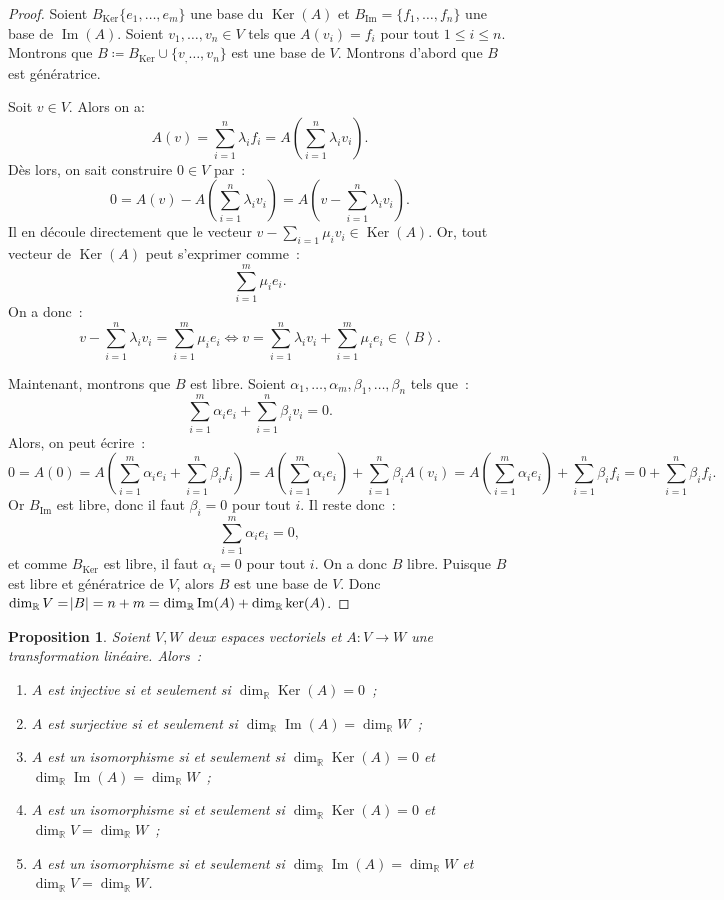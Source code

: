 \documentclass{article}
\DeclareMathOperator{\Ker}{Ker}
\DeclareMathOperator{\Imf}{Im}
\newcommand{\R}{\mathbb R}
\newcommand{\eng}[1]{\left\langle#1\right\rangle}
\newtheorem{prp}[thm]{Proposition}
\theoremstyle{definition}
\theoremstyle{remark}
\begin{document}
		\begin{proof} Soient $B_{\Ker}\{e_1, \dotsc, e_m\}$ une base du $\Ker(A)$ et $B_{\Imf} = \{f_1, \dotsc, f_n\}$ une base de $\Imf(A)$. Soient
		$v_1, \dotsc, v_n \in V$ tels que $A(v_i) = f_i$ pour tout $1 \leq i \leq n$. Montrons que $B \coloneqq B_{\Ker} \cup \{v_, \dotsc, v_n\}$ est une base de $V$.
		Montrons d'abord que $B$ est génératrice.

		Soit $v \in V$. Alors on a: \[A(v) = \sum_{i=1}^n\lambda_if_i = A\left(\sum_{i=1}^n\lambda_iv_i\right).\] Dès lors, on sait construire $0 \in V$ par~:
		\[0 = A(v) - A\left(\sum_{i=1}^n\lambda_iv_i\right) = A\left(v-\sum_{i=1}^n\lambda_iv_i\right).\] Il en découle directement que le vecteur
		$v - \sum_{i=1}\mu_iv_i \in \Ker(A)$. Or, tout vecteur de $\Ker(A)$ peut s'exprimer comme~: \[\sum_{i=1}^m\mu_ie_i.\] On a donc~:
		\[v-\sum_{i=1}^n\lambda_iv_i = \sum_{i=1}^m\mu_ie_i \iff v = \sum_{i=1}^n\lambda_iv_i + \sum_{i=1}^m\mu_ie_i \in \eng B.\]

		Maintenant, montrons que $B$ est libre. Soient $\alpha_1, \dotsc, \alpha_m, \beta_1, \dotsc, \beta_n$ tels que~:
		\[\sum_{i=1}^m\alpha_ie_i + \sum_{i=1}^n\beta_iv_i = 0.\] Alors, on peut écrire~:
		\[0 = A(0) = A\left(\sum_{i=1}^m\alpha_ie_i + \sum_{i=1}^n\beta_if_i\right) = A\left(\sum_{i=1}^m\alpha_ie_i\right) + \sum_{i=1}^n\beta_iA(v_i)
		= A\left(\sum_{i=1}^m\alpha_ie_i\right) + \sum_{i=1}^n\beta_if_i = 0 + \sum_{i=1}^n\beta_if_i.\] Or $B_{\Imf}$ est libre, donc il faut $\beta_i = 0$ pour tout
		$i$. Il reste donc~: \[\sum_{i=1}^m\alpha_ie_i = 0,\] et comme $B_{\Ker}$ est libre, il faut $\alpha_i = 0$ pour tout $i$. On a donc $B$ libre. Puisque $B$ est
		libre et génératrice de $V$, alors $B$ est une base de $V$. Donc $\dim_\R V = \abs B = n+m = \dim_\R\Imf(A) + \dim_\R\ker(A)$. \end{proof}

		\begin{prp}\label{condIsom} Soient $V, W$ deux espaces vectoriels et $A : V \to W$ une transformation linéaire. Alors~:
		\begin{enumerate}
			\item $A$ est injective si et seulement si $\dim_\R \Ker(A) = 0$~;
			\item $A$ est surjective si et seulement si $\dim_\R \Imf(A) = \dim_\R W$~;
			\item $A$ est un isomorphisme si et seulement si $\dim_\R\Ker(A) = 0$ et $\dim_\R\Imf(A) = \dim_\R W$~;
			\item $A$ est un isomorphisme si et seulement si $\dim_\R\Ker(A) = 0$ et $\dim_\R V = \dim_\R W$~;
			\item $A$ est un isomorphisme si et seulement si $\dim_\R \Imf(A) = \dim_\R W$ et $\dim_\R V = \dim_\R W$.
		\end{enumerate}
		\end{prp}
\end{document}
